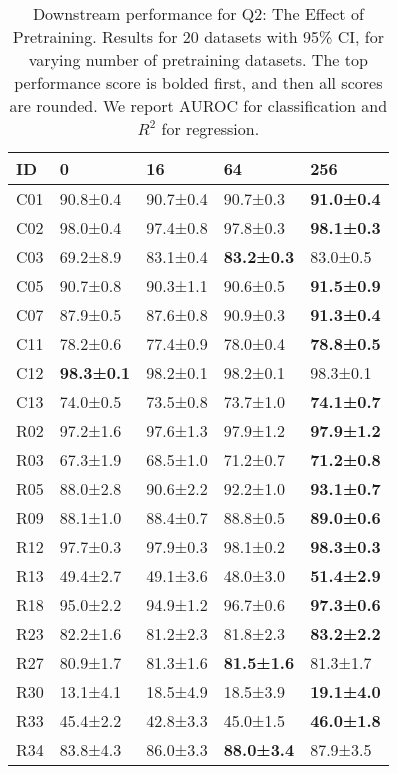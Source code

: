 \begin{table}
\center
\caption{Downstream performance for Q2: The Effect of Pretraining. Results for 20 datasets with 95\% CI, for varying number of pretraining datasets. The top performance score is bolded first, and then all scores are rounded. We report AUROC for classification and $R^2$ for regression.}
\label{tab:analysis_scaling_exp}
\begin{tabular}{lllll}
\toprule
ID & 0 & 16 & 64 & 256 \\
\midrule
C01 & 90.8±0.4 & 90.7±0.4 & 90.7±0.3 & \textbf{91.0±0.4} \\
C02 & 98.0±0.4 & 97.4±0.8 & 97.8±0.3 & \textbf{98.1±0.3} \\
C03 & 69.2±8.9 & 83.1±0.4 & \textbf{83.2±0.3} & 83.0±0.5 \\
C05 & 90.7±0.8 & 90.3±1.1 & 90.6±0.5 & \textbf{91.5±0.9} \\
C07 & 87.9±0.5 & 87.6±0.8 & 90.9±0.3 & \textbf{91.3±0.4} \\
C11 & 78.2±0.6 & 77.4±0.9 & 78.0±0.4 & \textbf{78.8±0.5} \\
C12 & \textbf{98.3±0.1} & 98.2±0.1 & 98.2±0.1 & 98.3±0.1 \\
C13 & 74.0±0.5 & 73.5±0.8 & 73.7±1.0 & \textbf{74.1±0.7} \\
R02 & 97.2±1.6 & 97.6±1.3 & 97.9±1.2 & \textbf{97.9±1.2} \\
R03 & 67.3±1.9 & 68.5±1.0 & 71.2±0.7 & \textbf{71.2±0.8} \\
R05 & 88.0±2.8 & 90.6±2.2 & 92.2±1.0 & \textbf{93.1±0.7} \\
R09 & 88.1±1.0 & 88.4±0.7 & 88.8±0.5 & \textbf{89.0±0.6} \\
R12 & 97.7±0.3 & 97.9±0.3 & 98.1±0.2 & \textbf{98.3±0.3} \\
R13 & 49.4±2.7 & 49.1±3.6 & 48.0±3.0 & \textbf{51.4±2.9} \\
R18 & 95.0±2.2 & 94.9±1.2 & 96.7±0.6 & \textbf{97.3±0.6} \\
R23 & 82.2±1.6 & 81.2±2.3 & 81.8±2.3 & \textbf{83.2±2.2} \\
R27 & 80.9±1.7 & 81.3±1.6 & \textbf{81.5±1.6} & 81.3±1.7 \\
R30 & 13.1±4.1 & 18.5±4.9 & 18.5±3.9 & \textbf{19.1±4.0} \\
R33 & 45.4±2.2 & 42.8±3.3 & 45.0±1.5 & \textbf{46.0±1.8} \\
R34 & 83.8±4.3 & 86.0±3.3 & \textbf{88.0±3.4} & 87.9±3.5 \\
\bottomrule
\end{tabular}
\end{table}



